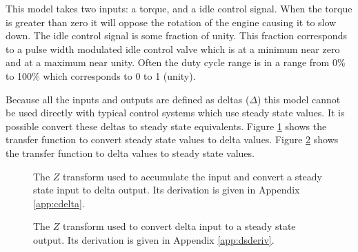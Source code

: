 \documentclass{article}
\begin{document}
This model takes two inputs: a torque, and a idle control signal.
When the torque is greater than zero it will oppose the rotation of
the engine causing it to slow down.
The idle control signal is some fraction of unity.
This fraction corresponds to a pulse width modulated idle control valve
which is at a minimum near zero and at a maximum near unity.
Often the duty cycle range is in a range from 0\% to 100\% which
corresponds to 0 to 1 (unity).

Because all the inputs and outputs are defined as deltas ($\Delta$)
this model cannot be used directly with typical control systems
which use steady state values.
It is possible convert these deltas to steady state equivalents.
Figure \ref{fig:sdtf} shows the transfer function to convert steady
state values to delta values.
Figure \ref{fig:dstf} shows the transfer function to delta values
to steady state values.

\begin{figure}[!htbp]

\begin{center}
\end{center}

\caption{The $Z$ transform used to accumulate the input and convert
a steady state input to delta output.
Its derivation is given in Appendix \ref{app:cdelta}.}
\label{fig:sdtf}

\end{figure}

\begin{figure}[!htbp]

\begin{center}
\end{center}

\caption{The $Z$ transform used to convert delta input to a steady
state output.
Its derivation is given in Appendix \ref{app:dsderiv}.}
\label{fig:dstf}

\end{figure}
\end{document}
